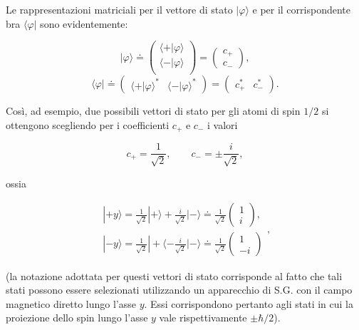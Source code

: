 Le rappresentazioni matriciali per il vettore di stato $| \varphi \rangle $ e per il corrispondente bra $\langle \varphi |$ sono evidentemente:

\begin{equation}
 | \varphi \rangle \doteq
\begin{pmatrix}
\langle + | \varphi \rangle\\
\langle - | \varphi \rangle \\
\end{pmatrix} = 
\begin{pmatrix}
c_+ \\
c_-
\end{pmatrix} ,
\end{equation}
\begin{equation}
\langle \varphi | \doteq
\begin{pmatrix}
\langle + | \varphi \rangle ^* &
\langle - | \varphi \rangle ^* 
\end{pmatrix} = 
\begin{pmatrix}
c^*_+ & c^*_-
\end{pmatrix} .
\end{equation}

Così, ad esempio, due possibili vettori di stato per gli atomi di spin $1/2$ si ottengono scegliendo per i coefficienti $c_+$ e $c_-$ i valori

\begin{equation}
c_+=\frac{1}{\sqrt{2}}, \qquad c_-=\pm \frac{i}{\sqrt{2}} ,
\end{equation}

ossia

\begin{equation}
\begin{array}{c}
|+y \rangle = \frac{1}{\sqrt{2}}|+ \rangle +\frac{i}{\sqrt{2}}| - \rangle \doteq \frac{1}{\sqrt{2}}
\begin{pmatrix}
1 \\
i
\end{pmatrix} ,\\
| -y \rangle = \frac{1}{\sqrt{2}}| + \langle -\frac{i}{\sqrt{2}}| - \rangle \doteq \frac{1}{\sqrt{2}}
\begin{pmatrix}
1 \\
-i
\end{pmatrix}
\end{array} ,
\label{cap3_15}
\end{equation}

(la notazione adottata per questi vettori di stato corrisponde al fatto che tali stati possono essere selezionati utilizzando un apparecchio di S.G. con il campo  magnetico diretto lungo l'asse $y$. Essi corrispondono pertanto agli stati in cui la proiezione dello spin lungo l'asse $y$ vale rispettivamente $\pm \hbar/2$).

